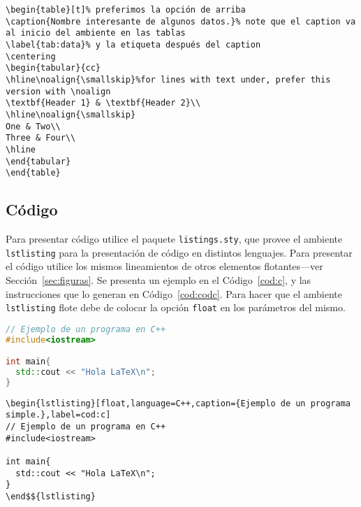 \documentclass[twocolumn,11pts]{IEEEtran}
\begin{document}
\begin{lstlisting}[float=tb,caption={Código que produce la Tabla~\ref{tab:data}.},label=cod:data]
\begin{table}[t]% preferimos la opción de arriba
\caption{Nombre interesante de algunos datos.}% note que el caption va al inicio del ambiente en las tablas
\label{tab:data}% y la etiqueta después del caption
\centering
\begin{tabular}{cc}
\hline\noalign{\smallskip}%for lines with text under, prefer this version with \noalign
\textbf{Header 1} & \textbf{Header 2}\\
\hline\noalign{\smallskip}
One & Two\\
Three & Four\\
\hline
\end{tabular}
\end{table}
\end{lstlisting}

\subsection{Código}

Para presentar código utilice el paquete \texttt{listings.sty}, que provee el ambiente \texttt{lstlisting} para la presentación de código en distintos lenguajes. Para presentar el código utilice los mismos lineamientos de otros elementos flotantes---ver Sección~\ref{sec:figuras}. Se presenta un ejemplo en el Código~\ref{cod:c}, y las instrucciones que lo generan en Código~\ref{cod:codc}. Para hacer que el ambiente \texttt{lstlisting} flote debe de colocar la opción \texttt{float} en los parámetros del mismo.

\begin{lstlisting}[float,language=C++,caption={Ejemplo de un programa simple.},label=cod:c]
// Ejemplo de un programa en C++
#include<iostream>

int main{
  std::cout << "Hola LaTeX\n";
}
\end{lstlisting}

\begin{lstlisting}[float=tb,caption={Código que produce el Código~\ref{cod:c}.},label=cod:codc,mathescape=true]
\begin{lstlisting}[float,language=C++,caption={Ejemplo de un programa simple.},label=cod:c]
// Ejemplo de un programa en C++
#include<iostream>

int main{
  std::cout << "Hola LaTeX\n";
}
\end$${lstlisting}
\end{lstlisting}
\end{document}

